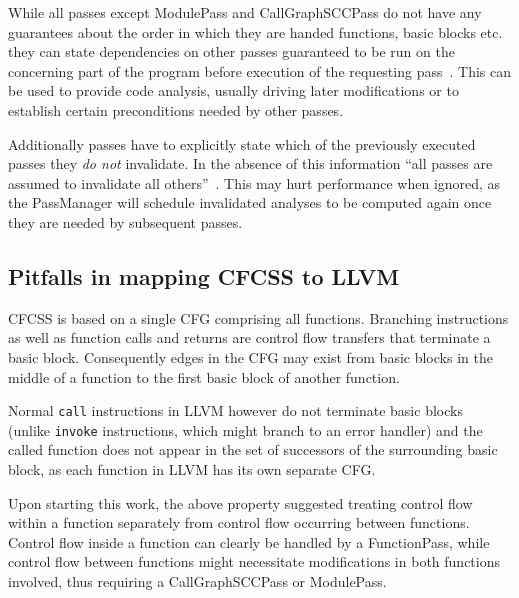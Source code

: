 While all passes except ModulePass and
CallGraphSCCPass do not have any guarantees about the order in which they are
handed functions, basic blocks etc. they can state dependencies on other passes
guaranteed to be run on the concerning part of the program before execution of
the requesting pass~\cite[Specifying interactions between
passes]{writing-passes}. This can be used to provide code analysis, usually
driving later modifications or to establish certain preconditions needed by
other passes.

Additionally passes have to explicitly state which of the previously executed
passes they \emph{do not} invalidate. In the absence of this information “all
passes are assumed to invalidate all others”~\cite[Specifying interactions
between passes]{writing-passes}. This may hurt performance when ignored, as the
PassManager will schedule invalidated analyses to be computed again once they
are needed by subsequent passes.


\subsection{Pitfalls in mapping CFCSS to LLVM}

CFCSS is based on a single CFG comprising all functions. Branching instructions
as well as function calls and returns are control flow transfers that terminate
a basic block. Consequently edges in the CFG may exist from basic blocks in the
middle of a function to the first basic block of another function.

Normal \texttt{call} instructions in LLVM however do not terminate basic
blocks~\cite{terminatorinst} (unlike \texttt{invoke} instructions, which might branch to an
error handler) and the called function does not appear in the set of successors
of the surrounding basic block, as each function in LLVM has its own separate
CFG.

 Upon starting this
work, the above property suggested treating control flow
within a function separately from control flow occurring between functions.
Control flow inside a function can clearly be handled by a FunctionPass, while
control flow between functions might necessitate modifications in both
functions involved, thus requiring a CallGraphSCCPass or ModulePass.
